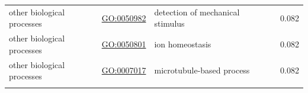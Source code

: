 \documentclass[
]{article}
\begin{document}
\begin{longtable}[]{@{}lllll@{}}
\begin{minipage}[t]{0.17\columnwidth}\raggedright
other biological processes\strut
\end{minipage} & \begin{minipage}[t]{0.17\columnwidth}\raggedright
\url{GO:0050982}\strut
\end{minipage} & \begin{minipage}[t]{0.17\columnwidth}\raggedright
detection of mechanical stimulus\strut
\end{minipage} & \begin{minipage}[t]{0.17\columnwidth}\raggedright
\strut
\end{minipage} & \begin{minipage}[t]{0.17\columnwidth}\raggedright
0.082\strut
\end{minipage}\tabularnewline
\begin{minipage}[t]{0.17\columnwidth}\raggedright
other biological processes\strut
\end{minipage} & \begin{minipage}[t]{0.17\columnwidth}\raggedright
\url{GO:0050801}\strut
\end{minipage} & \begin{minipage}[t]{0.17\columnwidth}\raggedright
ion homeostasis\strut
\end{minipage} & \begin{minipage}[t]{0.17\columnwidth}\raggedright
\strut
\end{minipage} & \begin{minipage}[t]{0.17\columnwidth}\raggedright
0.082\strut
\end{minipage}\tabularnewline
\begin{minipage}[t]{0.17\columnwidth}\raggedright
other biological processes\strut
\end{minipage} & \begin{minipage}[t]{0.17\columnwidth}\raggedright
\url{GO:0007017}\strut
\end{minipage} & \begin{minipage}[t]{0.17\columnwidth}\raggedright
microtubule-based process\strut
\end{minipage} & \begin{minipage}[t]{0.17\columnwidth}\raggedright
\strut
\end{minipage} & \begin{minipage}[t]{0.17\columnwidth}\raggedright
0.082\strut
\end{minipage}\tabularnewline
\begin{minipage}[t]{0.17\columnwidth}\raggedright

\end{minipage}
\end{longtable}
\end{document}
